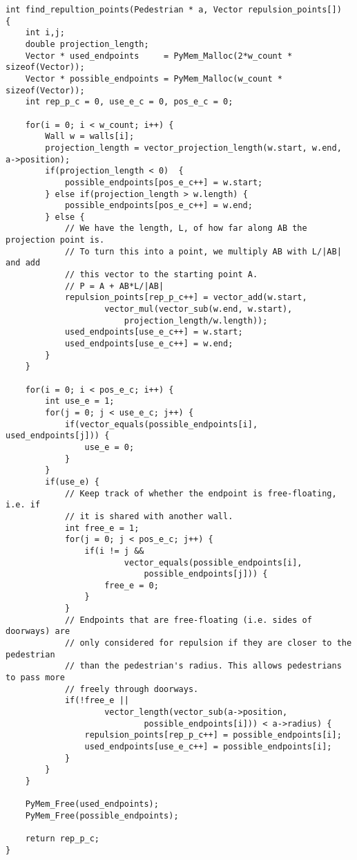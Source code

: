 \begin{lstlisting}[caption={Finding the wall repulsion 
    points.},label=lst:repulsion-points]
int find_repultion_points(Pedestrian * a, Vector repulsion_points[])
{
    int i,j;
    double projection_length;
    Vector * used_endpoints     = PyMem_Malloc(2*w_count * sizeof(Vector));
    Vector * possible_endpoints = PyMem_Malloc(w_count * sizeof(Vector));
    int rep_p_c = 0, use_e_c = 0, pos_e_c = 0;

    for(i = 0; i < w_count; i++) {
        Wall w = walls[i];
        projection_length = vector_projection_length(w.start, w.end, a->position);
        if(projection_length < 0)  {
            possible_endpoints[pos_e_c++] = w.start;
        } else if(projection_length > w.length) {
            possible_endpoints[pos_e_c++] = w.end;
        } else {
            // We have the length, L, of how far along AB the projection point is.
            // To turn this into a point, we multiply AB with L/|AB| and add
            // this vector to the starting point A.
			// P = A + AB*L/|AB|
            repulsion_points[rep_p_c++] = vector_add(w.start, 
                    vector_mul(vector_sub(w.end, w.start), 
                        projection_length/w.length));
            used_endpoints[use_e_c++] = w.start;
            used_endpoints[use_e_c++] = w.end;
        }
    }

    for(i = 0; i < pos_e_c; i++) {
        int use_e = 1;
        for(j = 0; j < use_e_c; j++) {
            if(vector_equals(possible_endpoints[i], used_endpoints[j])) {
                use_e = 0;
            }
        }
        if(use_e) {
			// Keep track of whether the endpoint is free-floating, i.e. if
			// it is shared with another wall.
			int free_e = 1;
			for(j = 0; j < pos_e_c; j++) {
				if(i != j && 
						vector_equals(possible_endpoints[i],
							possible_endpoints[j])) {
					free_e = 0;
				}
			}
			// Endpoints that are free-floating (i.e. sides of doorways) are
			// only considered for repulsion if they are closer to the pedestrian
			// than the pedestrian's radius. This allows pedestrians to pass more
			// freely through doorways.
			if(!free_e || 
					vector_length(vector_sub(a->position,
							possible_endpoints[i])) < a->radius) {
				repulsion_points[rep_p_c++] = possible_endpoints[i];
				used_endpoints[use_e_c++] = possible_endpoints[i];
			}
        }
    }

    PyMem_Free(used_endpoints);
    PyMem_Free(possible_endpoints);

    return rep_p_c;
}
\end{lstlisting}

